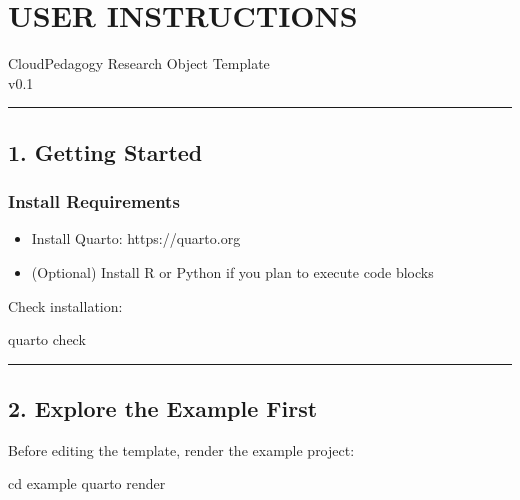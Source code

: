 \documentclass[
]{report}
\author{}
\date{}
\newenvironment{Shaded}{\begin{snugshade}}{\end{snugshade}}
\newcommand{\BuiltInTok}[1]{\textcolor[rgb]{0.00,0.23,0.31}{#1}}
\newcommand{\ExtensionTok}[1]{\textcolor[rgb]{0.00,0.23,0.31}{#1}}
\newcommand{\NormalTok}[1]{\textcolor[rgb]{0.00,0.23,0.31}{#1}}
\providecommand{\tightlist}{%
  \setlength{\itemsep}{0pt}\setlength{\parskip}{0pt}}
\renewcommand*\contentsname{Table of contents}
\newcommand\contentsname{Table of contents}
\begin{document}
\renewcommand*\contentsname{Table of contents}
{
\hypersetup{linkcolor=}
\setcounter{tocdepth}{2}
\tableofcontents
}

\chapter{USER INSTRUCTIONS}\label{user-instructions}

CloudPedagogy Research Object Template\\
v0.1

\begin{center}\rule{0.5\linewidth}{0.5pt}\end{center}

\section{1. Getting Started}\label{getting-started}

\subsection{Install Requirements}\label{install-requirements}

\begin{itemize}
\tightlist
\item
  Install Quarto: https://quarto.org
\item
  (Optional) Install R or Python if you plan to execute code blocks
\end{itemize}

Check installation:

\begin{Shaded}
\begin{Highlighting}[]
\ExtensionTok{quarto}\NormalTok{ check}
\end{Highlighting}
\end{Shaded}

\begin{center}\rule{0.5\linewidth}{0.5pt}\end{center}

\section{2. Explore the Example First}\label{explore-the-example-first}

Before editing the template, render the example project:

\begin{Shaded}
\begin{Highlighting}[]
\BuiltInTok{cd}\NormalTok{ example}
\ExtensionTok{quarto}\NormalTok{ render}
\end{Highlighting}
\end{Shaded}
\end{document}
